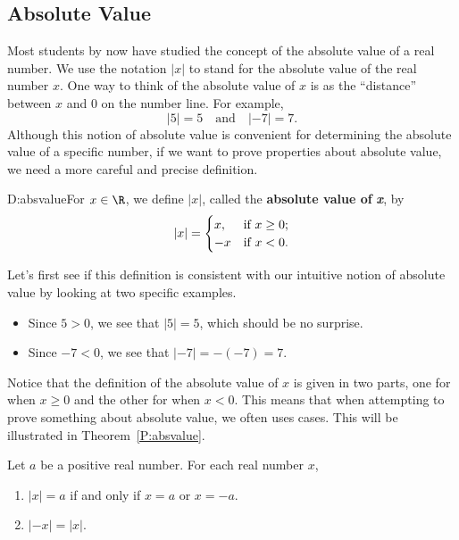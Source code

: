 \subsection*{Absolute Value}
Most students by now have studied the concept of the absolute value of a real number.  We use the notation $\left| x \right|$ to stand for the absolute value of the real number 
$x$.  One way to think of the absolute value of $x$ is as the ``distance'' between $x$ and 0 on the number line.  For example,
\[
\left| 5 \right| = 5 \quad \text{and} \quad \left| -7 \right| = 7.
\]
Although this notion of absolute value is convenient for determining the absolute value of a specific number, if we want to prove properties about absolute value, we need a more careful and precise definition.

\begin{defbox}{D:absvalue}{For $x \in \R$, we define $\left| x \right|$, \label{sym:absvalue} called the \textbf{absolute value of } \emph{\textbf{x}},
  by
\begin{equation}
\left| x \right| = 
\begin{cases}
x,    &  \text{if $x \geq 0$;} \\
-x    &  \text{if $x < 0$.}
\end{cases} \notag
\end{equation}}
\end{defbox}

\noindent
Let's first see if this definition is consistent with our intuitive notion of absolute value by looking at two specific examples.

\begin{itemize}
\item Since $5 > 0$, we see that $\left| 5 \right| = 5$, which should be no surprise.

\item Since $-7 < 0$, we see that $\left| -7 \right| = - \left( -7 \right) = 7$.
\end{itemize}
Notice that the definition of the absolute value of $x$ is given in two parts, one for when $x \geq 0$ and the other for when $x <0$.  This means that when attempting to prove something about absolute value, we often uses cases.  This will be illustrated in Theorem~\ref{P:absvalue}.

\begin{theorem}
Let $a$ be a positive real number.  For each real number $x$,
\label{P:absvalue}%
\begin{enumerate}
\item $\left| x \right| = a$ if and only if $x = a$ or $x = -a$.
\label{P:absvalue-1}%
\item $\left| -x \right| = \left| x \right|$.
\label{P:absvalue-2}%
\end{enumerate}
\end{theorem}

